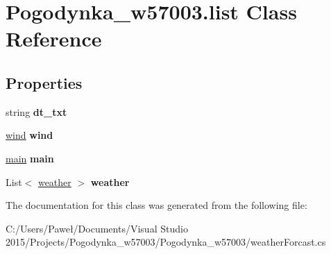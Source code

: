 \hypertarget{class_pogodynka__w57003_1_1list}{}\section{Pogodynka\+\_\+w57003.\+list Class Reference}
\label{class_pogodynka__w57003_1_1list}
\subsection*{Properties}
\begin{DoxyCompactItemize}
\item 
\mbox{\label{class_pogodynka__w57003_1_1list_ae9b9dcbb2a0d9f5dd950bc0f013327c5}} 
string {\bfseries dt\+\_\+txt}
\item 
\mbox{\label{class_pogodynka__w57003_1_1list_aa9e8fb1a4f3ed369b3873e3a0fa09357}} 
\mbox{\hyperlink{class_pogodynka__w57003_1_1wind}{wind}} {\bfseries wind}
\item 
\mbox{\label{class_pogodynka__w57003_1_1list_a022a0fd0e9b0dd60f302dcdfa1a80ae9}} 
\mbox{\hyperlink{class_pogodynka__w57003_1_1main}{main}} {\bfseries main}
\item 
\mbox{\label{class_pogodynka__w57003_1_1list_aab12839c65ae24bf60f65b092210b5a4}} 
List$<$ \mbox{\hyperlink{class_pogodynka__w57003_1_1weather}{weather}} $>$ {\bfseries weather}
\end{DoxyCompactItemize}


The documentation for this class was generated from the following file\+:\begin{DoxyCompactItemize}
\item 
C\+:/\+Users/\+Paweł/\+Documents/\+Visual Studio 2015/\+Projects/\+Pogodynka\+\_\+w57003/\+Pogodynka\+\_\+w57003/weather\+Forcast.\+cs\end{DoxyCompactItemize}
